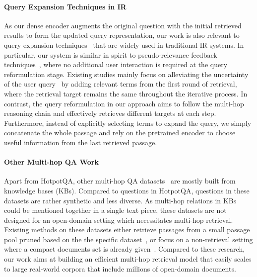 \documentclass{article} \usepackage{iclr2021_conference,times}
\begin{document}
\paragraph{Query Expansion Techniques in IR} As our dense encoder augments the original question with the initial retrieved results to form the updated query representation, our work is also relevant to query expansion techniques~\citep{rocchio1971relevance,voorhees1994query,ruthven2003survey} that are widely used in traditional IR systems. In particular, our system is similar in spirit to pseudo-relevance feedback techniques~\citep{croft1979using,cao2008selecting,lv2010positional}, where no additional user interaction is required at the query reformulation stage. Existing studies mainly focus on alleviating the uncertainty of the user query~\citep{collins2007estimation} by adding relevant terms from the first round of retrieval, where the retrieval target remains the same throughout the iterative process. In contrast, the query reformulation in our approach aims to follow the multi-hop reasoning chain and effectively retrieves different targets at each step. Furthermore, instead of explicitly selecting terms to expand the query, we simply concatenate the whole passage and rely on the pretrained encoder to choose useful information from the last retrieved passage.



\paragraph{Other Multi-hop QA Work} Apart from HotpotQA, other multi-hop QA datasets~\citep{Wikihop,ComplexWebQ,MetaQA} are mostly built from knowledge bases (KBs). Compared to questions in HotpotQA, questions in these datasets are rather synthetic and less diverse. As multi-hop relations in KBs could be mentioned together in a single text piece, these datasets are not designed for an open-domain setting which necessitates multi-hop retrieval. Existing methods on these datasets either retrieve passages from a small passage pool pruned based on the the specific dataset~\citep{sun2019pullnet,DrKIT}, or focus on a non-retrieval setting where a compact documents set is already given~\citep{de2018question,zhong2019coarse,tu2019multi,beltagy2020longformer}. Compared to these research, our work aims at building an efficient multi-hop retrieval model that easily scales to large real-world corpora that include millions of open-domain documents.
\end{document}
